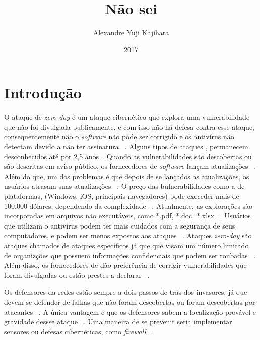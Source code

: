 \documentclass[brazil, utf8]{article}
\begin{document}
\title{Não sei}
\author{Alexandre Yuji Kajihara}
\date{2017}

\maketitle 

\section{Introdução}
O ataque de \textit{zero-day} é um ataque cibernético que explora uma vulnerabilidade que 
não foi divulgada publicamente, e com isso não há defesa contra esse ataque, consequentemente não
o \textit{software} não pode ser corrigido e os antivírus não detectam devido a não ter assinatura
~\cite{Bilge:2012}. Alguns tipos de ataques , permanecem desconhecidos até por 2,5 
anos~\cite{Bilge:2012}. Quando as vulnerabilidades são descobertas ou são descritas em aviso 
público, os fornecedores de \textit{software} lançam atualizações ~\cite{Bilge:2012}. Além do que, 
um dos problemas é que depois de se lançados as atualizações, os usuários atrasam suas atualizações
~\cite{Bilge:2012}. O preço das bulnerabilidades como a de plataformas, (Windows, iOS, principais 
navegadores) pode execeder mais de 100.000 dólares, dependendo da complexidade ~\cite{Bilge:2012}.
Atualmente, as explorações são incorporadas em arquivos não executáveis, como *.pdf, *.doc, *.xlsx
~\cite{Bilge:2012}. Usuários que utilizam o antivírus podem ter mais cuidados com a segurança de 
seus computadores, e podem ser menos expostos aos ataques ~\cite{Bilge:2012}. Ataques \textit{
zero-day} são ataques chamados de ataques específicos já que que visam um número limitado de 
organizções que possuem informações confidenciais que podem ser roubadas ~\cite{Bilge:2012}. Além 
disso, os fornecedores de  dão preferência de corrigir vulnerabilidades que foram 
divulgadas ou estão prestes a declarar ~\cite{Bilge:2012}.

Os defensores da redes estão sempre a dois passos de trás dos invasores, já que devem se defender 
de falhas que não foram descobertas ou foram descobertas por atacantes ~\cite{Last:2016}. A única 
vantagem é que os defensores sabem a localização provável e gravidade dessse ataque 
~\cite{Last:2016}. Uma maneira de se prevenir seria implementar sensores ou defesas cibernéticas, 
como \textit{firewall} ~\cite{Last:2016}.
\end{document}

